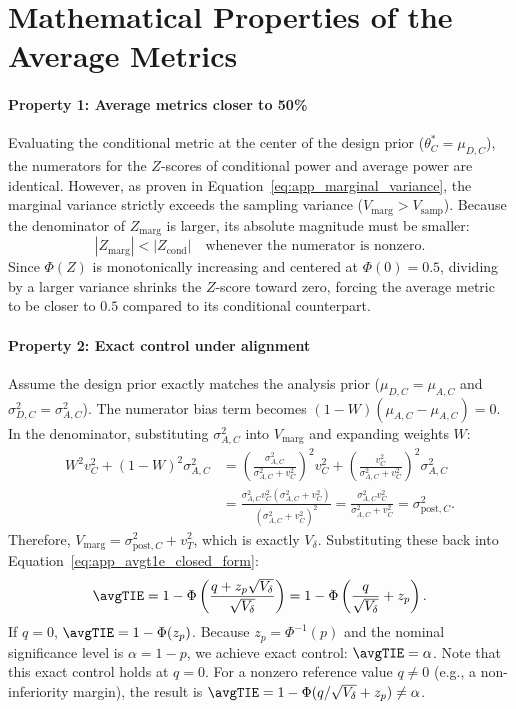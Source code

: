 \section{Mathematical Properties of the Average Metrics}

\paragraph{Property 1: Average metrics closer to 50\%}
Evaluating the conditional metric at the center of the design prior ($\theta_C^* = \mu_{D,C}$), the numerators for the $Z$-scores of conditional power and average power are identical. However, as proven in Equation~\eqref{eq:app_marginal_variance}, the marginal variance strictly exceeds the sampling variance ($V_{\text{marg}} > V_{\text{samp}}$). 
Because the denominator of $Z_{\text{marg}}$ is larger, its absolute magnitude must be smaller:
$$
    |Z_{\text{marg}}| < |Z_{\text{cond}}| \quad \text{whenever the numerator is nonzero}.
$$
Since $\Phi(Z)$ is monotonically increasing and centered at $\Phi(0) = 0.5$, dividing by a larger variance shrinks the $Z$-score toward zero, forcing the average metric to be closer to $0.5$ compared to its conditional counterpart. 

\paragraph{Property 2: Exact control under alignment}
Assume the design prior exactly matches the analysis prior ($\mu_{D,C} = \mu_{A,C}$ and $\sigma_{D,C}^2 = \sigma_{A,C}^2$). 
The numerator bias term becomes $(1 - W)(\mu_{A,C} - \mu_{A,C}) = 0$. 
In the denominator, substituting $\sigma_{A,C}^2$ into $V_{\text{marg}}$ and expanding weights $W$:
\begin{align*}
    W^2 v_C^2 + (1 - W)^2 \sigma_{A,C}^2 &= \left( \frac{\sigma_{A,C}^2}{\sigma_{A,C}^2 + v_C^2} \right)^2 v_C^2 + \left( \frac{v_C^2}{\sigma_{A,C}^2 + v_C^2} \right)^2 \sigma_{A,C}^2 \\
    &= \frac{\sigma_{A,C}^2 v_C^2 (\sigma_{A,C}^2 + v_C^2)}{(\sigma_{A,C}^2 + v_C^2)^2} = \frac{\sigma_{A,C}^2 v_C^2}{\sigma_{A,C}^2 + v_C^2} = \sigma_{\text{post},C}^2.
\end{align*}
Therefore, $V_{\text{marg}} = \sigma_{\text{post},C}^2 + v_T^2$, which is exactly $V_{\delta}$. Substituting these back into Equation~\eqref{eq:app_avgt1e_closed_form}:
$$
    \avgTIE = 1 - \Phi\left( \frac{q + z_p \sqrt{V_{\delta}}}{\sqrt{V_{\delta}}} \right) = 1 - \Phi\left( \frac{q}{\sqrt{V_{\delta}}} + z_p \right).
$$
If $q = 0$, $\avgTIE = 1 - \Phi(z_p)$. Because $z_p = \Phi^{-1}(p)$ and the nominal significance level is $\alpha = 1 - p$, we achieve exact control: $\avgTIE = \alpha$. Note that this exact control holds at $q = 0$. For a nonzero reference value $q \neq 0$ (e.g., a non-inferiority margin), the result is $\avgTIE = 1 - \Phi(q/\sqrt{V_{\delta}} + z_p) \neq \alpha$.

